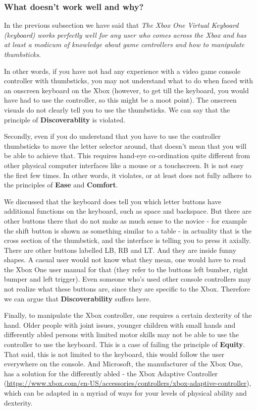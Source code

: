 \documentclass[
	letterpaper, %
]{jdf}
\begin{document}
\subsubsection{What doesn't work well and why?}
In the previous subsection we have said that \textit{The Xbox One Virtual Keyboard (keyboard) works perfectly well for any user who comes across the Xbox and has at least a modicum of knowledge about game controllers and how to manipulate thumbsticks}.

In other words, if you have not had any experience with a video game console controller with thumbsticks, you may not understand what to do when faced with an onscreen keyboard on the Xbox (however, to get till the keyboard, you would have had to use the controller, so this might be a moot point). The onscreen visuals do not clearly tell you to use the thumbsticks. We can say that the principle of \textbf{Discoverablity} is violated.

Secondly, even if you do understand that you have to use the controller thumbsticks to move the letter selector around, that doesn't mean that you will be able to achieve that. This requires hand-eye co-ordination quite different from other physical computer interfaces like a mouse or a touchscreen. It is not easy the first few times. In other words, it violates, or at least does not fully adhere to the principles of \textbf{Ease} and \textbf{Comfort}.

We discussed that the keyboard does tell you which letter buttons have additional functions on the keyboard, such as space and backspace. But there are other buttons there that do not make as much sense to the novice - for example the shift button is shown as something similar to a table - in actuality that is the cross section of the thumbstick, and the interface is telling you to press it axially. There are other buttons labelled LB, RB and LT. And they are inside funny shapes. A casual user would not know what they mean, one would have to read the Xbox One user manual for that (they refer to the buttons left bumber, right bumper and left trigger). Even someone who's used other console controllers may not realize what these buttons are, since they are specific to the Xbox. Therefore we can argue that \textbf{Discoverability} suffers here.

Finally, to manipulate the Xbox controller, one requires a certain dexterity of the hand. Older people with joint issues, younger children with small hands and differently abled persons with limited motor skills may not be able to use the controller to use the keyboard. This is a case of failing the principle of \textbf{Equity}. That said, this is not limited to the keyboard, this would follow the user everywhere on the console. And Microsoft, the manufacturer of the Xbox One, has a solution for the differently abled - the Xbox Adaptive Controller (\url{https://www.xbox.com/en-US/accessories/controllers/xbox-adaptive-controller}), which can be adapted in a myriad of ways for your levels of physical ability and dexterity.
\end{document}

